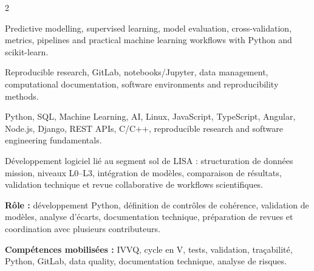\documentclass[8pt,a4paper,ragged2e,withhyper]{altacv}
\begin{document}
\begin{paracol}{2}


\small{
Predictive modelling, supervised learning, model evaluation, cross-validation, metrics, pipelines and practical machine learning workflows with Python and scikit-learn.
}

\divider


\small{
Reproducible research, GitLab, notebooks/Jupyter, data management, computational documentation, software environments and reproducibility methods.
}

\divider


\small{
Python, SQL, Machine Learning, AI, Linux, JavaScript, TypeScript, Angular, Node.js, Django, REST APIs, C/C++, reproducible research and software engineering fundamentals.
}

\end{paracol}



Développement logiciel lié au segment sol de LISA : structuration de données mission, niveaux L0--L3, intégration de modèles, comparaison de résultats, validation technique et revue collaborative de workflows scientifiques.

\textbf{Rôle :} développement Python, définition de contrôles de cohérence, validation de modèles, analyse d’écarts, documentation technique, préparation de revues et coordination avec plusieurs contributeurs.

\textbf{Compétences mobilisées :} IVVQ, cycle en V, tests, validation, traçabilité, Python, GitLab, data quality, documentation technique, analyse de risques.

\divider

\end{document}
